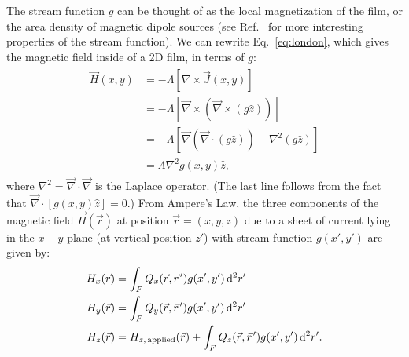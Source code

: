 \documentclass[final,3p,times,twocolumn]{elsarticle}
\newcommand{\pvec}[1]{\vec{#1}\mkern2mu\vphantom{#1}}
\newcounter{bla}
\begin{document}
The stream function $g$ can be thought of as the local magnetization of the film, or the area density of magnetic dipole sources (see Ref.~\cite{Brandt2005-wj} for more interesting properties of the stream function). We can rewrite Eq.~\ref{eq:london}, which gives the magnetic field inside of a 2D film, in terms of $g$:
\begin{align}
    \label{eq:london_stream}
    \begin{split}
        \vec{H}(x, y) &= -\Lambda\left[\nabla\times\vec{J}(x, y)\right]\\
        &= -\Lambda\left[\vec{\nabla}\times\left(\vec{\nabla}\times(g\hat{z})\right)\right]\\
        &= -\Lambda\left[\vec{\nabla}(\vec{\nabla}\cdot(g\hat{z}))-\nabla^2(g\hat{z})\right]\\
        &=\Lambda\nabla^2g(x,y)\hat{z},
    \end{split}
\end{align}
where $\nabla^2=\vec{\nabla}\cdot\vec{\nabla}$ is the Laplace operator. (The last line follows from the fact that $\vec{\nabla}\cdot\left[g(x,y)\hat{z}\right] = 0$.) From Ampere's Law, the three components of the magnetic field $\vec{H}(\vec{r})$ at position $\vec{r}=(x, y, z)$ due to a sheet of current lying in the $x-y$ plane (at vertical position $z'$) with stream function $g(x', y')$ are given by:
\begin{align}
    \label{eq:field_from_kernel}
    \begin{split}
        H_x(\vec{r}) &= \int_F Q_x(\vec{r},\pvec{r}')g(x', y')\,\mathrm{d}^2r'\\
        H_y(\vec{r}) &= \int_F Q_y(\vec{r},\pvec{r}')g(x', y')\,\mathrm{d}^2r'\\
        H_z(\vec{r}) &= H_{z,\,\mathrm{applied}}(\vec{r})
        + \int_F Q_z(\vec{r},\pvec{r}')g(x', y')\,\mathrm{d}^2r'.  
    \end{split}
\end{align}
\end{document}
